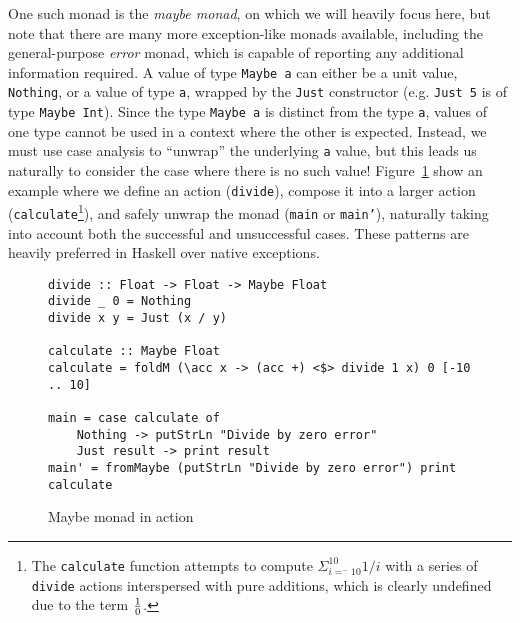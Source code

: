 \documentclass[11pt]{article}
\begin{document}
One such monad is the \emph{maybe monad}, on which we will heavily focus here, but note that there are many more exception-like monads available, including the general-purpose \emph{error} monad, which is capable of reporting any additional information required.
A value of type \texttt{Maybe a} can either be a unit value, \texttt{Nothing}, or a value of type \texttt{a}, wrapped by the \texttt{Just} constructor (e.g. \texttt{Just 5} is of type \texttt{Maybe Int}).
Since the type \texttt{Maybe a} is distinct from the type \texttt{a}, values of one type cannot be used in a context where the other is expected.
Instead, we must use case analysis to ``unwrap'' the underlying \texttt{a} value, but this leads us naturally to consider the case where there is no such value!
Figure~\ref{maybeMonad} show an example where we define an action (\texttt{divide}), compose it into a larger action (\texttt{calculate}\footnote{The \texttt{calculate} function attempts to compute $\Sigma_{i=^-10}^{10}{1/i}$ with a series of \texttt{divide} actions interspersed with pure additions, which is clearly undefined due to the term $1\over0$.}), and safely unwrap the monad (\texttt{main} or \texttt{main'}), naturally taking into account both the successful and unsuccessful cases.
These patterns are heavily preferred in Haskell over native exceptions.

\begin{figure}[H]
\caption{Maybe monad in action}
\label{maybeMonad}
\begin{verbatim}
divide :: Float -> Float -> Maybe Float
divide _ 0 = Nothing
divide x y = Just (x / y)

calculate :: Maybe Float
calculate = foldM (\acc x -> (acc +) <$> divide 1 x) 0 [-10 .. 10]

main = case calculate of
    Nothing -> putStrLn "Divide by zero error"
    Just result -> print result
main' = fromMaybe (putStrLn "Divide by zero error") print calculate
\end{verbatim}
\end{figure}
\end{document}
